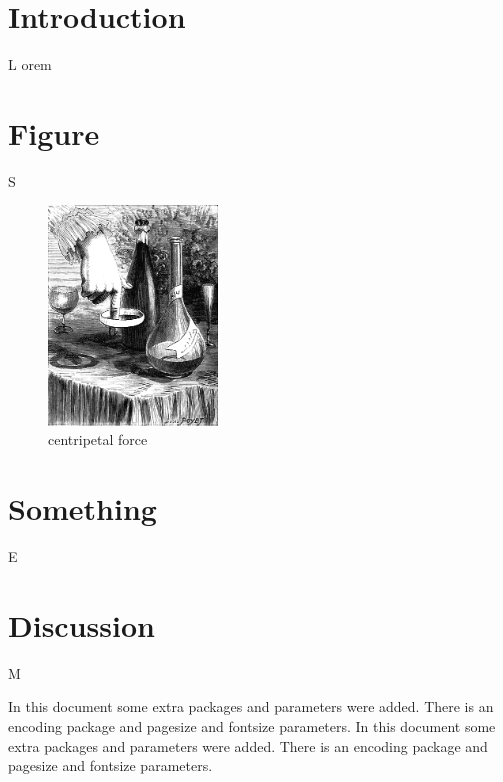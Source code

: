 \twocolumn
\chapter{Introduction}
\renewcommand{\LettrineFontHook}{\usefont{U}{GoudyIn}{xl}{n}\color{red!30!black}}
\lettrine[lines=4]{L}{}
orem \lipsum[1]

\begin{table}[ht]
\centering
\caption{A table}
\end{table}

\lipsum[2-5]

\chapter{Figure}

\lettrine[lines=4]{S}{}\lipsum[6-8]

\begin{figure}[h]
\centering
\includegraphics[width=45mm]{image/centforce.png}
\caption{centripetal force}
\end{figure}

\lipsum[9-14]

\chapter{Something}

\lettrine[lines=4]{E}{}\lipsum[14-23]

\chapter{Discussion}

\lettrine[lines=4]{M}{}\lipsum[24-31]

In this document some extra packages and parameters
were added. There is an encoding package
and pagesize and fontsize parameters.
In this document some extra packages and parameters
were added. There is an encoding package
and pagesize \autocite{Albarella2001} and fontsize parameters.

